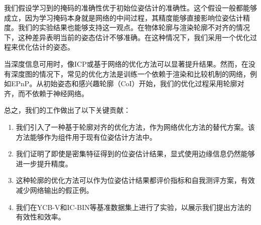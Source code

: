 我们假设学习到的掩码的准确性优于初始位姿估计的准确性。这个假设一般都能够成立，因为学习掩码本身就是网络的中间过程，其精度能够直接影响位姿估计精度。我们的实验结果也能够支持这一观点。在物体轮廓与渲染轮廓不对齐的情况下，这种差异表明当前的姿态估计不够准确。在这种情况下，我们采用一个优化过程来优化估计的姿态。

当深度信息可用时，像ICP或基于网络的优化方法\cite{lipson2022coupled}可以显著提升结果。然而，在没有深度图的情况下，常见的优化方法是训练一个依赖于渲染和比较机制的网络，例如EPnP\cite{EPnP}。从初始姿态和感兴趣轮廓（CoI）开始，我们的优化过程采用轮廓对齐，而不依赖于神经网络。

总之，我们的工作做出了以下关键贡献：

\begin{enumerate}
\item 我们引入了一种基于轮廓对齐的优化方法，作为网络优化方法的替代方案。该方法能够作为组件用于现有位姿估计方法中。
\item 我们证明了即使是密集特征得到的位姿估计结果，显式使用边缘信息仍然能够进一步提升精度。
\item 这种轮廓的优化方法可以作为位姿估计结果都评价指标和自我测评方案，有效减少网络输出的假正例。
\item 我们在YCB-V\cite{ycbv}和IC-BIN\cite{icbin}等基准数据集上进行了实验，以展示我们提出方法的有效性和效率。
\end{enumerate}





